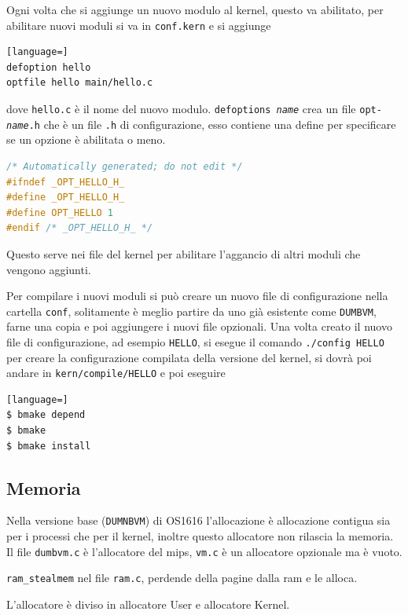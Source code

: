 \documentclass[12pt]{article}
\begin{document}
Ogni volta che si aggiunge un nuovo modulo al kernel, questo va abilitato, per abilitare nuovi moduli si va in \texttt{conf.kern} e si aggiunge
\begin{lstlisting}[language=]
defoption hello
optfile hello main/hello.c
\end{lstlisting}
dove \texttt{hello.c} \`e il nome del nuovo modulo. \texttt{defoptions \emph{name}} crea un file \texttt{opt-\emph{name}.h} che \`e un file \texttt{.h} di configurazione, esso contiene una define per specificare se un opzione \`e abilitata o meno.
\begin{lstlisting}[language=c]
/* Automatically generated; do not edit */
#ifndef _OPT_HELLO_H_
#define _OPT_HELLO_H_
#define OPT_HELLO 1
#endif /* _OPT_HELLO_H_ */
\end{lstlisting}
Questo serve nei file del kernel per abilitare l'aggancio di altri moduli che vengono aggiunti.

Per compilare i nuovi moduli si pu\`o creare un nuovo file di configurazione nella cartella \texttt{conf}, solitamente \`e meglio partire da uno gi\`a esistente come \texttt{DUMBVM}, farne una copia e poi aggiungere i nuovi file opzionali. Una volta creato il nuovo file di configurazione, ad esempio \texttt{HELLO}, si esegue il comando \texttt{./config HELLO} per creare la configurazione compilata della versione del kernel, si dovr\`a poi andare in \texttt{kern/compile/HELLO} e poi eseguire
\begin{lstlisting}[language=]
$ bmake depend
$ bmake
$ bmake install
\end{lstlisting}

\subsection{Memoria}
Nella versione base (\texttt{DUMNBVM}) di OS1616 l'allocazione  \`e allocazione contigua sia per i processi che per il kernel, inoltre questo allocatore non rilascia la memoria. Il file \texttt{dumbvm.c} \`e l'allocatore del mips, \texttt{vm.c} \`e un allocatore opzionale ma \`e vuoto.

\texttt{ram\_stealmem} nel file \texttt{ram.c}, perdende della pagine dalla ram e le alloca.

L'allocatore \`e diviso in allocatore User e allocatore Kernel.
\end{document}
